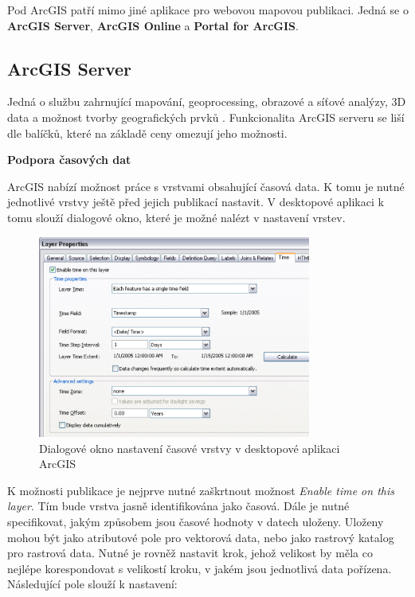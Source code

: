 Pod ArcGIS patří mimo jiné aplikace pro webovou mapovou
publikaci. Jedná se o \textbf{ArcGIS Server}, \textbf{ArcGIS Online} a
\textbf{Portal for ArcGIS}.

\newpage
\subsection{ArcGIS Server}

Jedná o službu zahrnující mapování, geoprocessing, obrazové a síťové
analýzy, 3D data a možnost tvorby geografických prvků
\cite{arcgis-publishing-service}. Funkcionalita ArcGIS serveru se liší
dle balíčků, které na základě ceny omezují jeho možnosti.

\bigskip
\noindent \textbf{Podpora časových dat}
 
ArcGIS nabízí možnost práce s vrstvami obsahující časová data. K
tomu je nutné jednotlivé vrstvy ještě před jejich publikací
nastavit. V desktopové aplikaci k tomu slouží dialogové okno, které je
možné nalézt v nastavení vrstev.

\begin{figure}[h!]  \centering
\includegraphics[width=0.8\textwidth]{./img/arcgis-layer-edit.png}
	\caption{Dialogové okno nastavení časové vrstvy v desktopové
aplikaci ArcGIS \cite{arcgis-publishing-service}}
	\label{fig:arcgis-time-settings}
\end{figure}

K možnosti publikace je nejprve nutné zaškrtnout možnost \textit{Enable time
on this layer}. Tím bude vrstva jasně identifikována jako časová. Dále
je nutné specifikovat, jakým způsobem jsou časové hodnoty v datech
uloženy. Uloženy mohou být jako atributové pole pro vektorová data, nebo
jako rastrový katalog pro rastrová data. Nutné je rovněž nastavit
krok, jehož velikost by měla co nejlépe korespondovat s velikostí kroku, 
v jakém jsou jednotlivá data pořízena. Následující pole slouží k nastavení:

